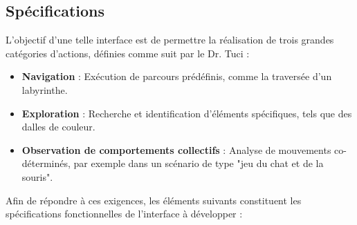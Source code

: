 \subsection{Spécifications} \label{sec:specs}

L’objectif d'une telle interface est de permettre la réalisation de trois grandes catégories d’actions, définies comme suit par le Dr. Tuci :  

\begin{itemize}
    \item \textbf{Navigation} : Exécution de parcours prédéfinis, comme la traversée d’un labyrinthe.
    \item \textbf{Exploration} : Recherche et identification d’éléments spécifiques, tels que des dalles de couleur.
    \item \textbf{Observation de comportements collectifs} : Analyse de mouvements co-déterminés, par exemple dans un scénario de type "jeu du chat et de la souris".
\end{itemize}

Afin de répondre à ces exigences, les éléments suivants constituent les spécifications fonctionnelles de l’interface à développer :

